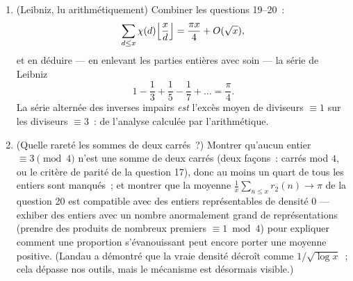 \begin{problem}
\begin{enumerate}[resume]
{        largeur $O(1)$)}.
  \item (Leibniz, lu arithmétiquement) Combiner les questions
        19--20~:
        \[
        \sum_{d \leq x}\chi(d)\Bigl\lfloor\frac
        xd\Bigr\rfloor = \frac{\pi x}4 + O(\sqrt x),
        \]
        et en déduire --- en enlevant les parties entières avec
        soin --- la série de Leibniz
        \[
        1 - \frac13 + \frac15 - \frac17 + \dots = \frac\pi4 .
        \]
        La série alternée des inverses impairs \emph{est}
        l'excès moyen de diviseurs $\equiv 1$ sur les diviseurs
        $\equiv 3$~: de l'analyse calculée par l'arithmétique.
  \item (Quelle rareté les sommes de deux carrés~?) Montrer
        qu'aucun entier $\equiv 3 \pmod 4$ n'est une somme de
        deux carrés (deux façons~: carrés mod $4$, ou le
        critère de parité de la question 17), donc au moins un
        quart de tous les entiers sont manqués~; et montrer que
        la moyenne $\frac1x\sum_{n\leq x}r_2(n) \to \pi$ de la
        question 20 est compatible avec des entiers
        représentables de densité $0$ --- exhiber des entiers
        avec un nombre anormalement grand de représentations
        (prendre des produits de nombreux premiers $\equiv 1
        \bmod 4$) pour expliquer comment une proportion
        s'évanouissant peut encore porter une moyenne positive.
        (Landau a démontré que la vraie densité décroît comme
        $1/\sqrt{\log x}$~; cela dépasse nos outils, mais le
        mécanisme est désormais visible.)
\end{enumerate}


\end{problem}
